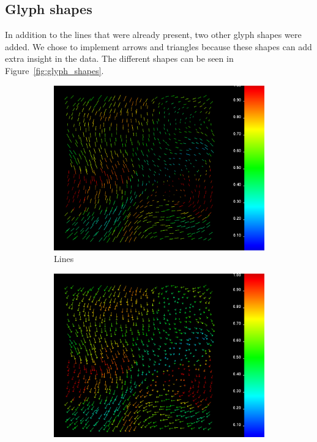 	\subsection{Glyph shapes}
		In addition to the lines that were already present, two other glyph shapes were added.
		We chose to implement arrows and triangles because these shapes can add extra insight in the data.
		The different shapes can be seen in Figure~\ref{fig:glyph_shapes}.
		\begin{figure}[htb]
		    \centering
		    \begin{subfigure}[htb]{.49\textwidth}
		        \includegraphics[width =\textwidth]{content/pictures/lines.png}
		        \caption{Lines}
		        \label{fig:lines}
		    \end{subfigure}
		    \begin{subfigure}[htb]{.49\textwidth}
		        \includegraphics[width =\textwidth]{content/pictures/arrows.png}

\end{subfigure}
\end{figure}
